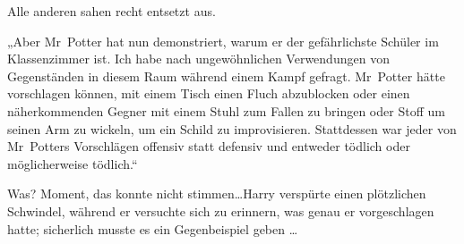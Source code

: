 Alle anderen sahen recht entsetzt aus.

„Aber Mr~Potter hat nun demonstriert, warum er der gefährlichste Schüler im Klassenzimmer ist. Ich habe nach ungewöhnlichen Verwendungen von Gegenständen in diesem Raum während einem Kampf gefragt. Mr~Potter hätte vorschlagen können, mit einem Tisch einen Fluch abzublocken oder einen näherkommenden Gegner mit einem Stuhl zum Fallen zu bringen oder Stoff um seinen Arm zu wickeln, um ein Schild zu improvisieren. Stattdessen war jeder von Mr~Potters Vorschlägen offensiv statt defensiv und entweder tödlich oder möglicherweise tödlich.“

Was? Moment, das konnte nicht stimmen…Harry verspürte einen plötzlichen Schwindel, während er versuchte sich zu erinnern, was genau er vorgeschlagen hatte; sicherlich musste es ein Gegenbeispiel geben …

